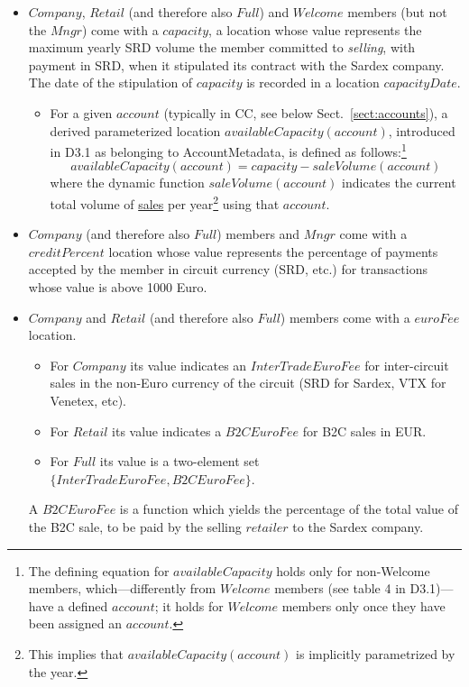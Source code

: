 \begin{itemize}
	\item $Company$, $Retail$ (and therefore also $Full$) and $Welcome$ members (but not the $Mngr$) come with a $capacity$, a location whose value represents the maximum yearly SRD volume the member committed to \emph{selling}, with payment in SRD, when it stipulated its contract with the Sardex company. The date of the stipulation of $capacity$ is recorded in a location $capacityDate$.
	\begin{itemize}
		\item For a given $account$ (typically in CC, see below Sect.~\ref{sect:accounts}), a derived parameterized location $availableCapacity(account)$, introduced in D3.1 as belonging to AccountMetadata, is defined as follows:\footnote{The defining equation for $availableCapacity$ holds only for non-Welcome members, which---differently from $Welcome$ members (see table 4 in D3.1)--- have a defined $account$; it holds for $Welcome$ members only once they have been assigned an $account$.} 
		\[availableCapacity(account)=capacity-saleVolume(account)\]
		where the dynamic function $saleVolume(account)$ indicates the current total volume of \underline{sales} per year\footnote{This implies that $availableCapacity(account)$ is implicitly parametrized by the year.} using that $account$.
	\end{itemize}

\item $Company$ (and therefore also $Full$) members and $Mngr$ come with a $creditPercent$ location whose value represents the percentage of payments accepted by the member in circuit currency (SRD, etc.) for transactions whose value is above 1000 Euro.

\item $Company$ and $Retail$ (and therefore also $Full$) members come with a $euroFee$ location. 
	\begin{itemize}
	\item For $Company$ its value indicates an $InterTradeEuroFee$ for inter-circuit sales in the non-Euro currency of the circuit (SRD for Sardex, VTX for Venetex, etc).
	\item For $Retail$ its value indicates a $B2CEuroFee$ for B2C sales in EUR.
	\item For $Full$ its value is a two-element set $\{InterTradeEuroFee,B2CEuroFee\}$. 
	\end{itemize}

A $B2CEuroFee$ is a function which yields the percentage of the total value of the B2C sale, to be paid by the selling $retailer$ to the Sardex company. 


\end{itemize}
